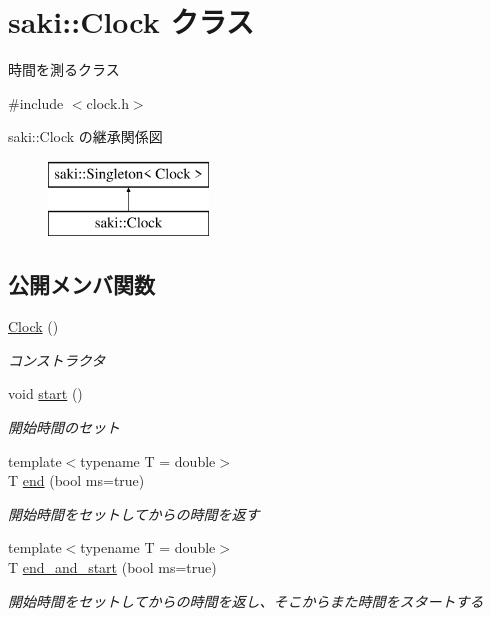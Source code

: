 \hypertarget{classsaki_1_1_clock}{}\section{saki\+:\+:Clock クラス}
\label{classsaki_1_1_clock}


時間を測るクラス  




{\ttfamily \#include $<$clock.\+h$>$}

saki\+:\+:Clock の継承関係図\begin{figure}[H]
\begin{center}
\leavevmode
\includegraphics[height=2.000000cm]{classsaki_1_1_clock}
\end{center}
\end{figure}
\subsection*{公開メンバ関数}
\begin{DoxyCompactItemize}
\item 
\mbox{\hyperlink{classsaki_1_1_clock_a235372b9a2044bab90f38c117b49d3ab}{Clock}} ()
\begin{DoxyCompactList}\small\item\em コンストラクタ \end{DoxyCompactList}\item 
void \mbox{\hyperlink{classsaki_1_1_clock_a522e7d5dcae1f457dfc1cd4eb9560cec}{start}} ()
\begin{DoxyCompactList}\small\item\em 開始時間のセット \end{DoxyCompactList}\item 
{\footnotesize template$<$typename T  = double$>$ }\\T \mbox{\hyperlink{classsaki_1_1_clock_afb3a41ac314bb58c010283bea60069f9}{end}} (bool ms=true)
\begin{DoxyCompactList}\small\item\em 開始時間をセットしてからの時間を返す \end{DoxyCompactList}\item 
{\footnotesize template$<$typename T  = double$>$ }\\T \mbox{\hyperlink{classsaki_1_1_clock_a6df6705089065ac8f9f3cdb718d7284f}{end\+\_\+and\+\_\+start}} (bool ms=true)
\begin{DoxyCompactList}\small\item\em 開始時間をセットしてからの時間を返し、そこからまた時間をスタートする \end{DoxyCompactList}\end{DoxyCompactItemize}
